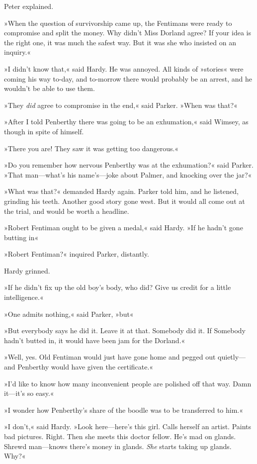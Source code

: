 Peter explained.

»When the question of survivorship came up, the Fentimans were ready to compromise and split the money. Why didn't Miss Dorland agree? If your idea is the right one, it was much the safest way. But it was she who insisted on an inquiry.«

»I didn't know that,« said Hardy. He was annoyed. All kinds of »stories« were coming his way to-day, and to-morrow there would probably be an arrest, and he wouldn't be able to use them.

»They \textit{did} agree to compromise in the end,« said Parker. »When was that?«

»After I told Penberthy there was going to be an exhumation,« said Wimsey, as though in spite of himself.

»There you are! They saw it was getting too dangerous.«

»Do you remember how nervous Penberthy was at the exhumation?« said Parker. »That man—what's his name's—joke about Palmer, and knocking over the jar?«

»What was that?« demanded Hardy again. Parker told him, and he listened, grinding his teeth. Another good story gone west. But it would all come out at the trial, and would be worth a headline.

»Robert Fentiman ought to be given a medal,« said Hardy. »If he hadn't gone butting in\longdash«

»Robert Fentiman?« inquired Parker, distantly.

Hardy grinned.

»If he didn't fix up the old boy's body, who did? Give us credit for a little intelligence.«

»One admits nothing,« said Parker, »but\longdash«

»But everybody says he did it. Leave it at that. Somebody did it. If Somebody hadn't butted in, it would have been jam for the Dorland.«

»Well, yes. Old Fentiman would just have gone home and pegged out quietly—and Penberthy would have given the certificate.«

»I'd like to know how many inconvenient people are polished off that way. Damn it—it's so easy.«

»I wonder how Penberthy's share of the boodle was to be transferred to him.«

»I don't,« said Hardy. »Look here—here's this girl. Calls herself an artist. Paints bad pictures. Right. Then she meets this doctor fellow. He's mad on glands. Shrewd man—knows there's money in glands. \textit{She} starts taking up glands. Why?«

